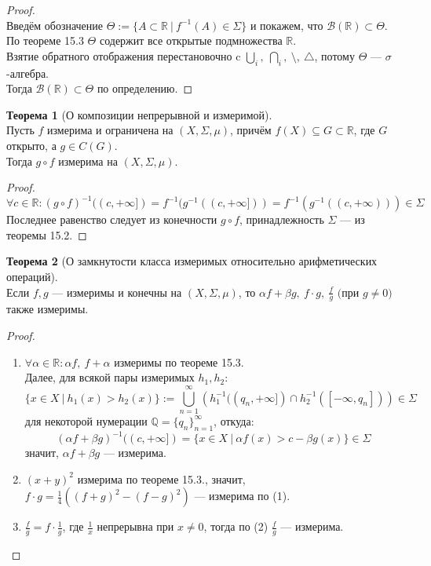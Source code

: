 \documentclass[11pt,a4paper]{report}
\def\Real{\mathbb{R}}
\def\Rational{\mathbb{Q}}
\theoremstyle{definition}
\theoremstyle{definition}
\newtheorem{theorem}{Теорема}[section]
\theoremstyle{definition}
\begin{document}
	\begin{proof}$  $\\
		Введём обозначение $ \Theta := \{A \subset \Real\ |\ f^{-1}(A) \in \Sigma \} $ и покажем, что $ \mathcal{B}(\Real) \subset \Theta $.\\
		По теореме 15.3 $ \Theta $ содержит все открытые подмножества $ \Real $.\\ 
		Взятие обратного отображения перестановочно c $ \bigcup_{i},\ \bigcap_{i},\ \setminus,\ \triangle $, потому $ \Theta $ — $ \sigma $-алгебра.\\
		Тогда $ \mathcal{B}(\Real) \subset \Theta $ по определению.
	\end{proof}
	\begin{theorem}[О композиции непрерывной и измеримой]$  $\\
		 Пусть $ f $ измерима и ограничена на $ (X, \Sigma, \mu) $, причём $ f(X) \subseteq G \subset \Real $, где $ G $ открыто, а $ g \in C(G) $.\\
		 Тогда $ g \circ f $ измерима на $ (X, \Sigma, \mu) $.
	\end{theorem}
	\begin{proof}
		\[ \forall c \in \Real: (g \circ f)^{-1}((c, +\infty]) = f^{-1}(g^{-1}((c, +\infty])) = f^{-1}(g^{-1}((c, +\infty))) \in \Sigma \]
		Последнее равенство следует из конечности $ g \circ f $, принадлежность $ \Sigma $ — из теоремы 15.2.
	\end{proof}
	\begin{theorem}[О замкнутости класса измеримых относительно арифметических операций]$  $\\
		Если $ f, g $ — измеримы и конечны на $ (X, \Sigma, \mu) $, то $ \alpha f + \beta g,\ f \cdot g,\ \frac{f}{g} \mbox{ (при } g \neq 0) $ также измеримы.
	\end{theorem}
	\begin{proof}$  $
		\begin{enumerate}[(1)]
			\item $ \forall \alpha \in \Real: \alpha f,\ f + \alpha $ измеримы по теореме 15.3.\\
						Далее, для всякой пары измеримых $ h_{1}, h_{2} $: 
						\[ \{x \in X\ |\  h_{1}(x) > h_{2}(x) \} := \bigcup\limits_{n=1}^{\infty}{\left ( h^{-1}_{1}((q_{n}, +\infty]) \cap h^{-1}_{2}([-\infty, q_{n}])\right ) } \in \Sigma \]
						для некоторой нумерации $ \Rational = \{q_{n}\}_{n=1}^{\infty} $, откуда: \[ (\alpha f + \beta g)^{-1}((c, +\infty]) = \{x \in X\ |\ \alpha f(x) > c - \beta g(x) \} \in \Sigma \]
						значит, $ \alpha f + \beta g $ — измерима.
			\item $ (x + y)^{2} $ измерима по теореме 15.3., значит, $ f \cdot g = \frac{1}{4}((f + g)^{2} - (f - g)^{2}) $ — измерима по (1).
			\item $ \frac{f}{g} = f \cdot \frac{1}{g} $, где $ \frac{1}{x} $ непрерывна при $ x \neq 0 $, тогда по (2) $ \frac{f}{g} $ — ­измерима.
		\end{enumerate}
	\end{proof}
\end{document}
